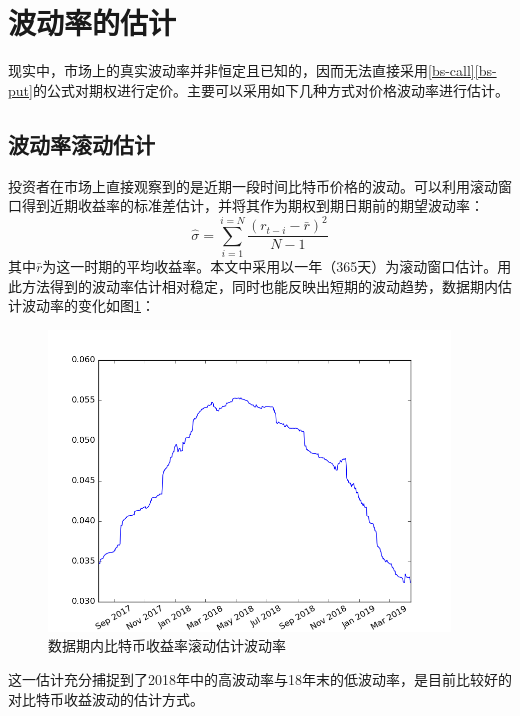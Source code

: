     \section{波动率的估计}
    现实中，市场上的真实波动率并非恒定且已知的，因而无法直接采用\ref{bs-call}\ref{bs-put}的公式对期权进行定价。主要可以采用如下几种方式对价格波动率进行估计。
    \subsection{波动率滚动估计}
    投资者在市场上直接观察到的是近期一段时间比特币价格的波动。可以利用滚动窗口得到近期收益率的标准差估计，并将其作为期权到期日期前的期望波动率：
    \begin{equation}\label{volatility-rolling}
        \hat{\sigma}=\sum_{i=1}^{i=N}\frac{(r_{t-i}-\bar{r})^2}{N-1}
    \end{equation}
    其中$\bar{r}$为这一时期的平均收益率。本文中采用以一年（365天）为滚动窗口估计。用此方法得到的波动率估计相对稳定，同时也能反映出短期的波动趋势，数据期内估计波动率的变化如图\ref{fig:volatility}：
    \begin{figure}[H]
        \begin{small}
            \begin{center}
                \includegraphics[width=0.95\textwidth]{figures/volatility.png}
            \end{center}
            \caption{数据期内比特币收益率滚动估计波动率}
            \label{fig:volatility}
        \end{small}
    \end{figure}
    这一估计充分捕捉到了2018年中的高波动率与18年末的低波动率，是目前比较好的对比特币收益波动的估计方式。
